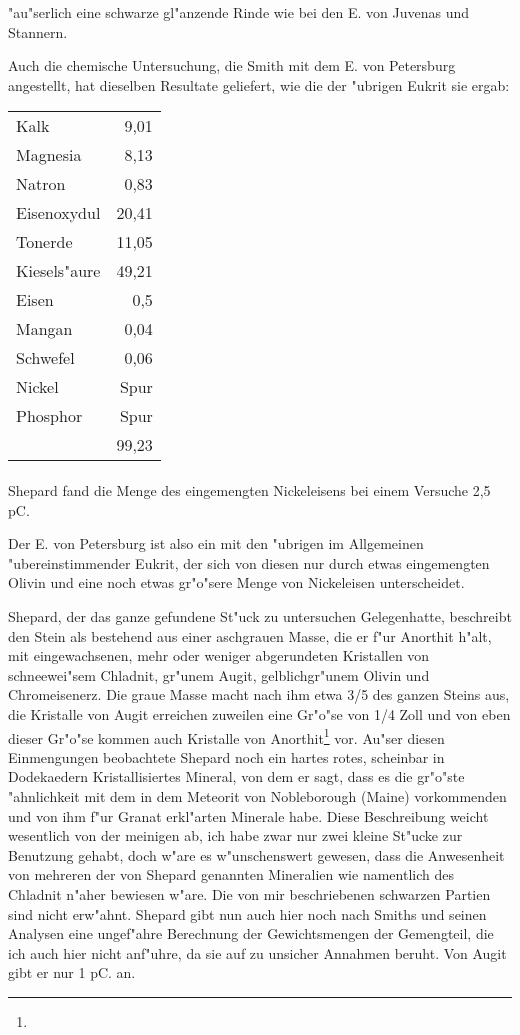 \documentclass[a4paper, 11pt, oneside]{article}
\begin{document}
"au"serlich eine schwarze gl"anzende Rinde wie bei den E. von Juvenas und Stannern.

Auch die chemische Untersuchung, die Smith mit dem E. von Petersburg angestellt, hat dieselben Resultate geliefert, wie die der "ubrigen Eukrit sie ergab:
\begin{center}
\begin{tabular}{ l r }
    Kalk & 9,01\\
    Magnesia & 8,13\\
    Natron & 0,83\\
    Eisenoxydul & 20,41\\
    Tonerde & 11,05\\
    Kiesels"aure & 49,21\\
    Eisen & 0,5\\
    Mangan & 0,04\\
    Schwefel & 0,06\\
    Nickel & Spur\\
    Phosphor & Spur\\
     & 99,23\\
\end{tabular}
\end{center}
\paragraph{}
Shepard fand die Menge des eingemengten Nickeleisens bei einem Versuche 2,5 pC.

Der E. von Petersburg ist also ein mit den "ubrigen im Allgemeinen "ubereinstimmender Eukrit, der sich von diesen nur durch etwas eingemengten Olivin und eine noch etwas gr"o"sere Menge von Nickeleisen unterscheidet.

Shepard, der das ganze gefundene St"uck zu untersuchen Gelegenhatte, beschreibt den Stein als bestehend aus einer aschgrauen Masse, die er f"ur Anorthit h"alt, mit eingewachsenen, mehr oder weniger abgerundeten Kristallen von schneewei"sem Chladnit, gr"unem Augit, gelblichgr"unem Olivin und Chromeisenerz. Die graue Masse macht nach ihm etwa 3/5 des ganzen Steins aus, die Kristalle von Augit erreichen zuweilen eine Gr"o"se von 1/4 Zoll und von eben dieser Gr"o"se kommen auch Kristalle von Anorthit\footnote{} vor. Au"ser diesen Einmengungen beobachtete Shepard noch ein hartes rotes, scheinbar in Dodekaedern Kristallisiertes Mineral, von dem er sagt, dass es die gr"o"ste "ahnlichkeit mit dem in dem Meteorit von Nobleborough (Maine) vorkommenden und von ihm f"ur Granat erkl"arten Minerale habe. Diese Beschreibung weicht wesentlich von der meinigen ab, ich habe zwar nur zwei kleine St"ucke zur Benutzung gehabt, doch w"are es w"unschenswert gewesen, dass die Anwesenheit von mehreren der von Shepard genannten Mineralien wie namentlich des Chladnit n"aher bewiesen w"are. Die von mir beschriebenen schwarzen Partien sind nicht erw"ahnt. Shepard gibt nun auch hier noch nach Smiths und seinen Analysen eine ungef"ahre Berechnung der Gewichtsmengen der Gemengteil, die ich auch hier nicht anf"uhre, da sie auf zu unsicher Annahmen beruht. Von Augit gibt er nur 1 pC. an.
\end{document}
